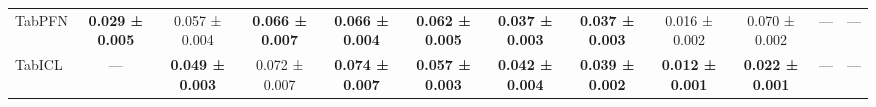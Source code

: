 \begin{table}[H]
{\begin{tabular}{lccccccccccc}
    TabPFN & \textbf{0.029 ± 0.005} & 0.057 ± 0.004 & \textbf{0.066 ± 0.007} & \textbf{0.066 ± 0.004} & \textbf{0.062 ± 0.005} & \textbf{0.037 ± 0.003} & \textbf{0.037 ± 0.003} & 0.016 ± 0.002 & 0.070 ± 0.002 & — & — \\
    TabICL & — & \textbf{0.049 ± 0.003} & 0.072 ± 0.007 & \textbf{0.074 ± 0.007} & \textbf{0.057 ± 0.003} & \textbf{0.042 ± 0.004} & \textbf{0.039 ± 0.002} & \textbf{0.012 ± 0.001} & \textbf{0.022 ± 0.001} & — & — \\
    \bottomrule
\end{tabular}
    }
\end{table}
